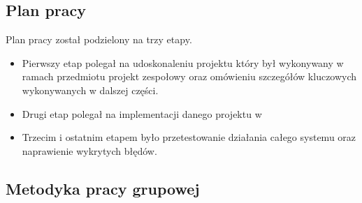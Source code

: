 \subsection{Plan pracy}
Plan pracy został podzielony na trzy etapy. 
\begin{itemize}
\item Pierwszy  etap polegał na udoskonaleniu projektu który był wykonywany w ramach przedmiotu projekt zespołowy  oraz omówieniu szczegółów kluczowych wykonywanych w dalszej części.

\item Drugi etap polegał na implementacji danego projektu w 

\item Trzecim i ostatnim etapem było przetestowanie  działania całego systemu oraz naprawienie wykrytych błędów.
\end{itemize}
\subsection{Metodyka pracy grupowej}
